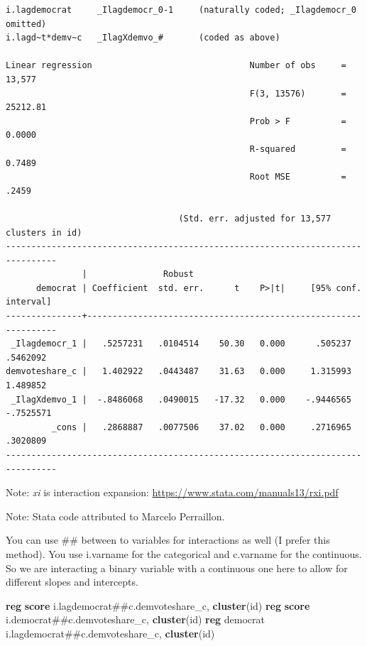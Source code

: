 \documentclass[
]{book}
\newenvironment{Shaded}{\begin{snugshade}}{\end{snugshade}}
\newcommand{\KeywordTok}[1]{\textcolor[rgb]{0.13,0.29,0.53}{\textbf{#1}}}
\newcommand{\NormalTok}[1]{#1}
\begin{document}
\begin{verbatim}
i.lagdemocrat     _Ilagdemocr_0-1     (naturally coded; _Ilagdemocr_0 omitted)
i.lagd~t*demv~c   _IlagXdemvo_#       (coded as above)

Linear regression                               Number of obs     =     13,577
                                                F(3, 13576)       =   25212.81
                                                Prob > F          =     0.0000
                                                R-squared         =     0.7489
                                                Root MSE          =      .2459

                                  (Std. err. adjusted for 13,577 clusters in id)
--------------------------------------------------------------------------------
               |               Robust
      democrat | Coefficient  std. err.      t    P>|t|     [95% conf. interval]
---------------+----------------------------------------------------------------
 _Ilagdemocr_1 |   .5257231   .0104514    50.30   0.000      .505237    .5462092
demvoteshare_c |   1.402922   .0443487    31.63   0.000     1.315993    1.489852
 _IlagXdemvo_1 |  -.8486068   .0490015   -17.32   0.000    -.9446565   -.7525571
         _cons |   .2868887   .0077506    37.02   0.000     .2716965    .3020809
--------------------------------------------------------------------------------
\end{verbatim}

Note: \emph{xi} is interaction expansion: \url{https://www.stata.com/manuals13/rxi.pdf}

Note: Stata code attributed to Marcelo Perraillon.

You can use \#\# between to variables for interactions as well (I prefer this method). You use i.varname for the categorical and c.varname for the continuous. So we are interacting a binary variable with a continuous one here to
allow for different slopes and intercepts.

\begin{Shaded}
\begin{Highlighting}[]
\KeywordTok{reg} \KeywordTok{score}\NormalTok{ i.lagdemocrat\#\#c.demvoteshare\_c, }\KeywordTok{cluster}\NormalTok{(id)}
\KeywordTok{reg} \KeywordTok{score}\NormalTok{ i.democrat\#\#c.demvoteshare\_c, }\KeywordTok{cluster}\NormalTok{(id)}
\KeywordTok{reg}\NormalTok{ democrat i.lagdemocrat\#\#c.demvoteshare\_c, }\KeywordTok{cluster}\NormalTok{(id)}
\end{Highlighting}
\end{Shaded}
\end{document}
